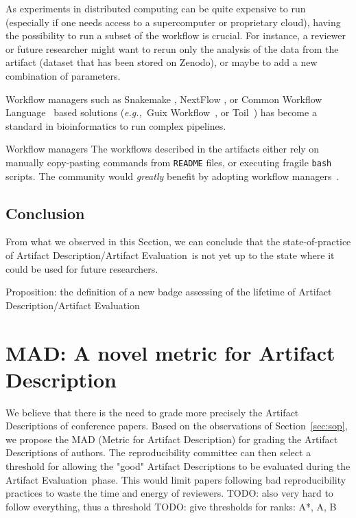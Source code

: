 \documentclass[sigconf]{acmart}
\newcommand{\eg}{\emph{e.g.,}}
\newcommand{\ad}{Artifact Description}
\newcommand{\aeval}{Artifact Evaluation}
\newcommand{\adae}{\ad/\aeval}
\newcommand{\todo}[1]{{\color{red}TODO: #1}}
\begin{document}
As experiments in distributed computing can be quite expensive to run (especially if one needs access to a supercomputer or proprietary cloud), having the possibility to run a subset of the workflow is crucial.
For instance, a reviewer or future researcher might want to rerun only the analysis of the data from the artifact (dataset that has been stored on Zenodo), or maybe to add a new combination of parameters. 

Workflow managers \cite{wratten2021reproducible} such as Snakemake \cite{koster2012snakemake}, NextFlow \cite{di2017nextflow}, or Common Workflow Language\ \cite{amstutz2016common} based solutions (\eg\ Guix Workflow\ \cite{strozzi2019scalable}, or Toil\ \cite{vivian2017toil}) has become a standard in bioinformatics to run complex pipelines.

\begin{lesson}{Workflow managers}{}
  The workflows described in the artifacts either rely on manually copy-pasting commands from \texttt{README} files, or executing fragile \texttt{bash} scripts.
  The community would \emph{greatly} benefit by adopting workflow managers\ \cite{wratten2021reproducible}.
\end{lesson}

\subsection{Conclusion}\label{sec:sop:conclu}

From what we observed in this Section, we can conclude that the state-of-practice of \adae\ is not yet up to the state where it could be used for future researchers.

Proposition: the definition of a new badge assessing of the lifetime of \adae


%
\section{MAD: A novel metric for \ad}

We believe that there is the need to grade more precisely the \ad s of conference papers.
Based on the observations of Section\ \ref{sec:sop}, we propose the MAD (Metric for \ad) for grading the \ad s of authors.
The reproducibility committee can then select a threshold for allowing the "good" \ad s to be evaluated during the \aeval\ phase.
This would limit papers following bad reproducibility practices to waste the time and energy of reviewers.
\todo{also very hard to follow everything, thus a threshold}
\todo{give thresholds for ranks: A*, A, B}
\end{document}
